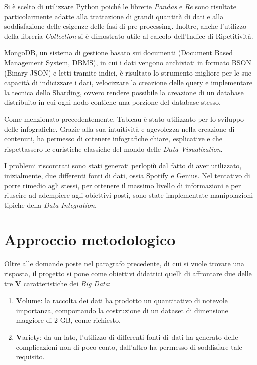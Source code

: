 \documentclass[fleqn,10pt]{SelfArx} %
\begin{document}
{Si è scelto di utilizzare Python poiché le librerie \textit{Pandas} e \textit{Re} sono risultate particolarmente adatte alla trattazione di grandi quantità di dati e alla soddisfazione delle esigenze delle fasi di pre-processing. Inoltre, anche l’utilizzo della libreria \textit{Collection} si è dimostrato utile al calcolo dell’Indice di Ripetitività.

MongoDB, un sistema di gestione basato sui documenti (Document Based Management System, DBMS), in cui i dati vengono archiviati in formato BSON (Binary JSON) e letti tramite indici, è risultato lo strumento migliore per le sue capacità di indicizzare i dati, velocizzare la creazione delle query e implementare la tecnica dello Sharding, ovvero rendere possibile la creazione di un database distribuito in cui ogni nodo contiene una porzione del database stesso.

Come menzionato precedentemente, Tableau è stato utilizzato per lo sviluppo delle infografiche. Grazie alla sua intuitività e agevolezza nella creazione di contenuti, ha permesso di ottenere infografiche chiare, esplicative e che rispettassero le euristiche classiche del mondo delle \textit{Data Visualization}.

I problemi riscontrati sono stati generati perlopiù dal fatto di aver utilizzato, inizialmente, due differenti fonti di dati, ossia Spotify e Genius. Nel tentativo di porre rimedio agli stessi, per ottenere il massimo livello di informazioni e per riuscire ad adempiere agli obiettivi posti, sono state implementate manipolazioni tipiche della \textit{Data Integration}.

}
\section{Approccio metodologico}

Oltre alle domande poste nel paragrafo precedente, di cui si vuole trovare una risposta, il progetto si pone come obiettivi didattici quelli di affrontare due delle tre \textbf{V} caratteristiche dei \textit{Big Data}:
\begin{enumerate}
\item \textbf{V}olume: la raccolta dei dati ha prodotto un quantitativo di notevole importanza, comportando la costruzione di un dataset di dimensione maggiore di 2 GB, come richiesto.
\item \textbf{V}ariety: da un lato, l’utilizzo di differenti fonti di dati ha generato delle complicazioni non di poco conto, dall’altro ha permesso di soddisfare tale requisito.
\end{enumerate}
\end{document}
